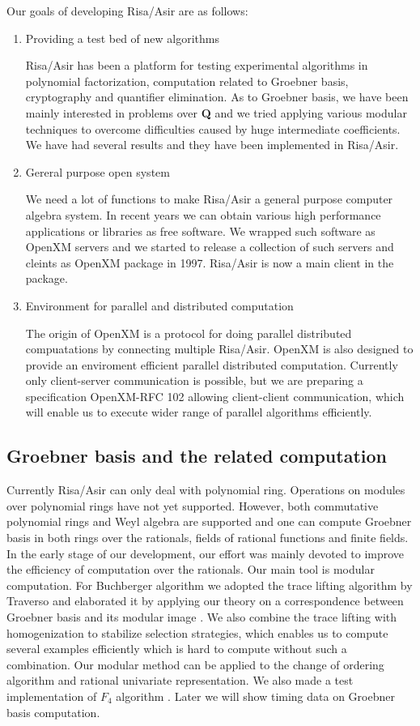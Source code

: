 \documentclass[runningheads]{cl2emult}
\begin{document}
Our goals of developing Risa/Asir are as follows:

\begin{enumerate}
\item Providing a test bed of new algorithms

Risa/Asir has been a platform for testing experimental algorithms in
polynomial factorization, computation related to Groebner basis,
cryptography and quantifier elimination. As to Groebner basis, we have
been mainly interested in problems over {\bf Q} and we tried applying
various modular techniques to overcome difficulties caused by huge
intermediate coefficients. We have had several results and they have
been implemented in Risa/Asir.

\item Gereral purpose open system

We need a lot of functions to make Risa/Asir a general purpose
computer algebra system.  In recent years we can obtain various high
performance applications or libraries as free software. We wrapped
such software as OpenXM servers and we started to release a collection
of such servers and cleints as OpenXM package in 1997. Risa/Asir is
now a main client in the package.

\item Environment for parallel and distributed computation

The origin of OpenXM is a protocol for doing parallel distributed
compuatations by connecting multiple Risa/Asir. OpenXM is also
designed to provide an enviroment efficient parallel distributed
computation. Currently only client-server communication is possible,
but we are preparing a specification OpenXM-RFC 102 allowing
client-client communication, which will enable us to execute
wider range of parallel algorithms efficiently.
\end{enumerate}

\subsection{Groebner basis and the related computation}

Currently Risa/Asir can only deal with polynomial ring. Operations on
modules over polynomial rings have not yet supported.  However, both
commutative polynomial rings and Weyl algebra are supported and one
can compute Groebner basis in both rings over the rationals, fields of
rational functions and finite fields. In the early stage of our
development, our effort was mainly devoted to improve the efficiency
of computation over the rationals. Our main tool is modular
computation. For Buchberger algorithm we adopted the trace lifting
algorithm by Traverso \cite{TRAV} and elaborated it by applying our
theory on a correspondence between Groebner basis and its modular
image \cite{NOYO}. We also combine the trace lifting with
homogenization to stabilize selection strategies, which enables us to
compute several examples efficiently which is hard to compute without
such a combination.  Our modular method can be applied to the change
of ordering algorithm and rational univariate representation.  We also
made a test implementation of $F_4$ algorithm \cite{F4}. Later we will
show timing data on Groebner basis computation.
\end{document}

